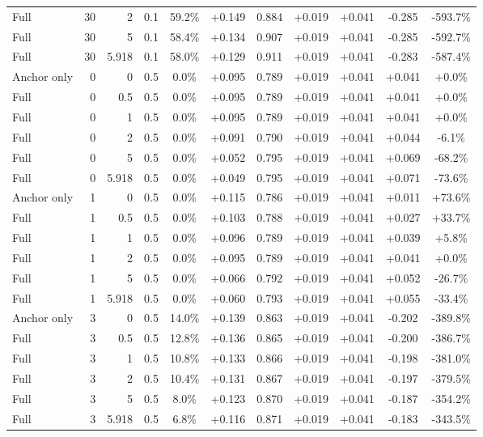 \begin{table}[htbp]
\begin{tabular}{lrrrccccccc}
Full & 30 & 2 & 0.1 & 59.2\% & +0.149 & 0.884 & +0.019 & +0.041 & -0.285 & -593.7\% \\
Full & 30 & 5 & 0.1 & 58.4\% & +0.134 & 0.907 & +0.019 & +0.041 & -0.285 & -592.7\% \\
Full & 30 & 5.918 & 0.1 & 58.0\% & +0.129 & 0.911 & +0.019 & +0.041 & -0.283 & -587.4\% \\
Anchor only & 0 & 0 & 0.5 & 0.0\% & +0.095 & 0.789 & +0.019 & +0.041 & +0.041 & +0.0\% \\
Full & 0 & 0.5 & 0.5 & 0.0\% & +0.095 & 0.789 & +0.019 & +0.041 & +0.041 & +0.0\% \\
Full & 0 & 1 & 0.5 & 0.0\% & +0.095 & 0.789 & +0.019 & +0.041 & +0.041 & +0.0\% \\
Full & 0 & 2 & 0.5 & 0.0\% & +0.091 & 0.790 & +0.019 & +0.041 & +0.044 & -6.1\% \\
Full & 0 & 5 & 0.5 & 0.0\% & +0.052 & 0.795 & +0.019 & +0.041 & +0.069 & -68.2\% \\
Full & 0 & 5.918 & 0.5 & 0.0\% & +0.049 & 0.795 & +0.019 & +0.041 & +0.071 & -73.6\% \\
Anchor only & 1 & 0 & 0.5 & 0.0\% & +0.115 & 0.786 & +0.019 & +0.041 & +0.011 & +73.6\% \\
Full & 1 & 0.5 & 0.5 & 0.0\% & +0.103 & 0.788 & +0.019 & +0.041 & +0.027 & +33.7\% \\
Full & 1 & 1 & 0.5 & 0.0\% & +0.096 & 0.789 & +0.019 & +0.041 & +0.039 & +5.8\% \\
Full & 1 & 2 & 0.5 & 0.0\% & +0.095 & 0.789 & +0.019 & +0.041 & +0.041 & +0.0\% \\
Full & 1 & 5 & 0.5 & 0.0\% & +0.066 & 0.792 & +0.019 & +0.041 & +0.052 & -26.7\% \\
Full & 1 & 5.918 & 0.5 & 0.0\% & +0.060 & 0.793 & +0.019 & +0.041 & +0.055 & -33.4\% \\
Anchor only & 3 & 0 & 0.5 & 14.0\% & +0.139 & 0.863 & +0.019 & +0.041 & -0.202 & -389.8\% \\
Full & 3 & 0.5 & 0.5 & 12.8\% & +0.136 & 0.865 & +0.019 & +0.041 & -0.200 & -386.7\% \\
Full & 3 & 1 & 0.5 & 10.8\% & +0.133 & 0.866 & +0.019 & +0.041 & -0.198 & -381.0\% \\
Full & 3 & 2 & 0.5 & 10.4\% & +0.131 & 0.867 & +0.019 & +0.041 & -0.197 & -379.5\% \\
Full & 3 & 5 & 0.5 & 8.0\% & +0.123 & 0.870 & +0.019 & +0.041 & -0.187 & -354.2\% \\
Full & 3 & 5.918 & 0.5 & 6.8\% & +0.116 & 0.871 & +0.019 & +0.041 & -0.183 & -343.5\% \\

\end{tabular}
\end{table}
